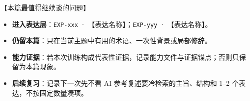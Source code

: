 \documentclass[11pt,a4paper]{ctexart}
\begin{document}

\begin{aiinteraction}{【本篇最值得继续谈的问题】}
\end{aiinteraction}


\begin{itemize}
  \item \textbf{\color{readGreen}进入表达层}：\texttt{EXP-xxx} · 【表达名称】；\texttt{EXP-yyy} · 【表达名称】。
  \item \textbf{\color{readMain}仍留本篇}：只在当前主题中有用的术语、一次性背景或局部修辞。
  \item \textbf{\color{readGray}能力证据}：若本次训练构成代表性证据，记录能力文件与证据锚点；否则只保留为本篇现象。
  \item \textbf{\color{readGray}后续复习}：记录下一次先不看 AI 参考复述要冷检索的主旨、结构和 1--2 个表达，不按固定数量凑项。
\end{itemize}
\end{document}
